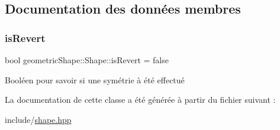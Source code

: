 \subsection{Documentation des données membres}
\mbox{\label{classgeometric_shape_1_1_shape_a34812f582bdf0a89b0d7e9a0b86dddbf}} 
\subsubsection{\texorpdfstring{is\+Revert}{isRevert}}
{\footnotesize\ttfamily bool geometric\+Shape\+::\+Shape\+::is\+Revert = false\hspace{0.3cm}{\ttfamily [protected]}}

Booléen pour savoir si une symétrie à été effectué 

La documentation de cette classe a été générée à partir du fichier suivant \+:\begin{DoxyCompactItemize}
\item 
include/\hyperlink{shape_8hpp}{shape.\+hpp}\end{DoxyCompactItemize}

